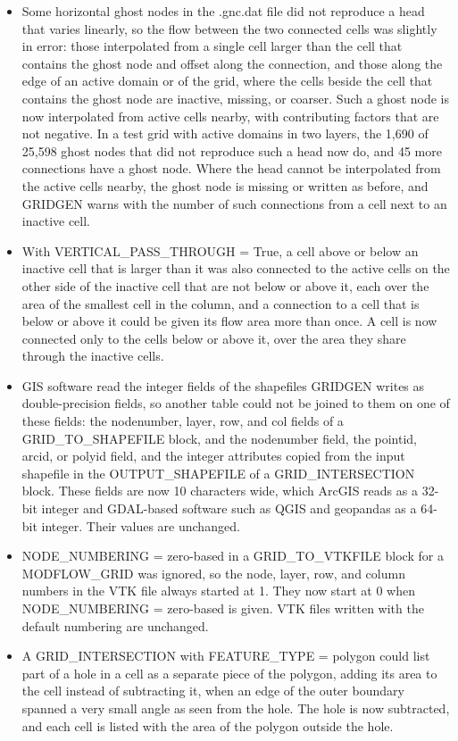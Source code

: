 \begin{itemize}[label=--]
  \item Some horizontal ghost nodes in the .gnc.dat file did not reproduce a head that varies linearly, so the flow between the two connected cells was slightly in error: those interpolated from a single cell larger than the cell that contains the ghost node and offset along the connection, and those along the edge of an active domain or of the grid, where the cells beside the cell that contains the ghost node are inactive, missing, or coarser. Such a ghost node is now interpolated from active cells nearby, with contributing factors that are not negative. In a test grid with active domains in two layers, the 1,690 of 25,598 ghost nodes that did not reproduce such a head now do, and 45 more connections have a ghost node. Where the head cannot be interpolated from the active cells nearby, the ghost node is missing or written as before, and GRIDGEN warns with the number of such connections from a cell next to an inactive cell.
  \item With VERTICAL\_PASS\_THROUGH = True, a cell above or below an inactive cell that is larger than it was also connected to the active cells on the other side of the inactive cell that are not below or above it, each over the area of the smallest cell in the column, and a connection to a cell that is below or above it could be given its flow area more than once. A cell is now connected only to the cells below or above it, over the area they share through the inactive cells.
  \item GIS software read the integer fields of the shapefiles GRIDGEN writes as double-precision fields, so another table could not be joined to them on one of these fields: the nodenumber, layer, row, and col fields of a GRID\_TO\_SHAPEFILE block, and the nodenumber field, the pointid, arcid, or polyid field, and the integer attributes copied from the input shapefile in the OUTPUT\_SHAPEFILE of a GRID\_INTERSECTION block. These fields are now 10 characters wide, which ArcGIS reads as a 32-bit integer and GDAL-based software such as QGIS and geopandas as a 64-bit integer. Their values are unchanged.
  \item NODE\_NUMBERING = zero-based in a GRID\_TO\_VTKFILE block for a MODFLOW\_GRID was ignored, so the node, layer, row, and column numbers in the VTK file always started at 1. They now start at 0 when NODE\_NUMBERING = zero-based is given. VTK files written with the default numbering are unchanged.
  \item A GRID\_INTERSECTION with FEATURE\_TYPE = polygon could list part of a hole in a cell as a separate piece of the polygon, adding its area to the cell instead of subtracting it, when an edge of the outer boundary spanned a very small angle as seen from the hole. The hole is now subtracted, and each cell is listed with the area of the polygon outside the hole.

\end{itemize}
